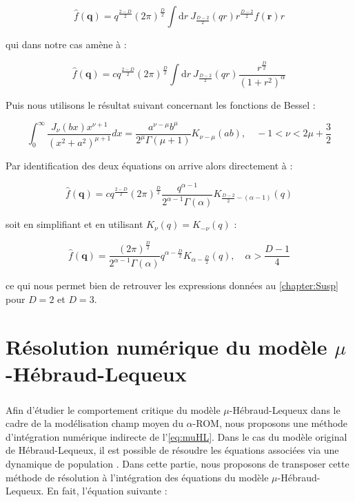 \begin{equation}
	\hat{f}(\mathbf{q}) = q^{\frac{2-D}{2}}(2\pi)^{\frac{D}{2}}\int\mathrm{d}r~J_{\frac{D-2}{2}}(qr)r^\frac{D-2}{2}f(\mathbf{r})r
\end{equation}

\noindent qui dans notre cas amène à : 

\begin{equation}
	\hat{f}(\mathbf{q}) = c q^{\frac{2-D}{2}}(2\pi)^{\frac{D}{2}}\int\mathrm{d}r~J_{\frac{D-2}{2}}(qr)\frac{r^\frac{D}{2}}{(1+r^2)^\alpha}
\end{equation}

\noindent Puis nous utilisons le résultat suivant concernant les fonctions de Bessel \cite{zwillinger_6_7_2014} :

\begin{equation}
\int_0^{\infty} \frac{J_\nu(b x) x^{\nu+1}}{\left(x^2+a^2\right)^{\mu+1}} d x=\frac{a^{\nu-\mu} b^\mu}{2^\mu \Gamma(\mu+1)} K_{\nu-\mu}(a b), \quad -1 < \nu < 2\mu + \frac{3}{2}
\end{equation}

\noindent Par identification des deux équations on arrive alors directement à :

\begin{equation}
	\hat{f}(\mathbf{q}) = c q^{\frac{2-D}{2}}(2\pi)^{\frac{D}{2}}\frac{q^{\alpha-1}}{2^{\alpha - 1}\Gamma(\alpha)}K_{\frac{D-2}{2}-(\alpha-1)}(q)
\end{equation}

\noindent soit en simplifiant et en utilisant $K_\nu (q) = K_{-\nu}(q)$ :

\begin{equation}
	\hat{f}(\mathbf{q}) = \frac{(2\pi)^{\frac{D}{2}}}{2^{\alpha-1}\Gamma(\alpha)}q^{\alpha-\frac{D}{2}}K_{\alpha-\frac{D}{2}}(q), \quad \alpha > \frac{D-1}{4}
\end{equation}

\noindent ce qui nous permet bien de retrouver les expressions données au \autoref{chapter:Susp} pour $D=2$ et $D=3$.

\section{Résolution numérique du modèle $\mu$-Hébraud-Lequeux}

\label{sec:ResolNumMuHL}

\subparagraph{}Afin d'étudier le comportement critique du modèle $\mu$-Hébraud-Lequeux dans le cadre de la modélisation champ moyen du $\alpha$-ROM, nous proposons une méthode d'intégration numérique indirecte de l'\autoref{eq:muHL}. Dans le cas du modèle original de Hébraud-Lequeux, il est possible de résoudre les équations associées via une dynamique de population \cite{bouchaud_spontaneous_2016}. Dans cette partie, nous proposons de transposer cette méthode de résolution à l'intégration des équations du modèle $\mu$-Hébraud-Lequeux. En fait, l'équation suivante : 

